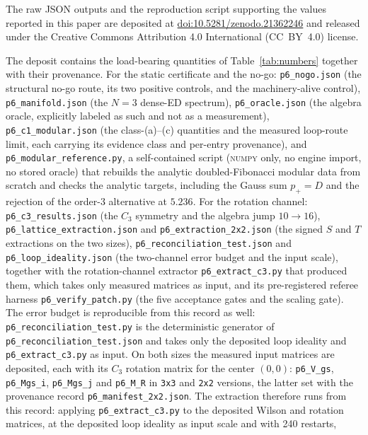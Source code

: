 \documentclass[aps,pra,twocolumn,superscriptaddress,longbibliography,floatfix,nofootinbib]{revtex4-2}
\begin{document}
The raw JSON outputs and the reproduction script supporting the values
reported in this paper are deposited at
\href{https://doi.org/10.5281/zenodo.21362246}{doi:10.5281/zenodo.21362246}
and released under the Creative Commons Attribution 4.0 International
(CC~BY~4.0) license.

The deposit contains the load-bearing quantities of Table~\ref{tab:numbers}
together with their provenance. For the static certificate and the no-go:
\texttt{p6\_nogo.json} (the structural no-go route, its two positive controls, and
the machinery-alive control), \texttt{p6\_manifold.json} (the $N=3$ dense-ED
spectrum), \texttt{p6\_oracle.json} (the algebra oracle, explicitly labeled as such
and not as a measurement), \texttt{p6\_c1\_modular.json} (the class-(a)--(c)
quantities and the measured loop-route limit, each carrying its evidence class
and per-entry provenance), and \texttt{p6\_modular\_reference.py}, a
self-contained script (\textsc{numpy} only, no engine import, no stored oracle)
that rebuilds the analytic doubled-Fibonacci modular data from scratch and
checks the analytic targets, including the Gauss sum $p_{+}=D$ and the rejection
of the order-3 alternative at $5.236$. For the rotation channel:
\texttt{p6\_c3\_results.json} (the $C_3$ symmetry and the algebra jump $10\to16$),
\texttt{p6\_lattice\_extraction.json} and \texttt{p6\_extraction\_2x2.json} (the signed
$S$ and $T$ extractions on the two sizes), \texttt{p6\_reconciliation\_test.json}
and \texttt{p6\_loop\_ideality.json} (the two-channel error budget and the input
scale), together with the rotation-channel extractor \texttt{p6\_extract\_c3.py}
that produced them, which takes only measured matrices as input, and its
pre-registered referee harness \texttt{p6\_verify\_patch.py} (the five acceptance
gates and the scaling gate). The error budget is reproducible from this record as
well: \texttt{p6\_reconciliation\_test.py} is the deterministic generator of
\texttt{p6\_reconciliation\_test.json} and takes only the deposited loop ideality
and \texttt{p6\_extract\_c3.py} as input. On both sizes the measured input matrices are
deposited, each with its $C_3$ rotation matrix for the center $(0,0)$:
\texttt{p6\_V\_gs}, \texttt{p6\_Mgs\_i}, \texttt{p6\_Mgs\_j} and \texttt{p6\_M\_R} in
\texttt{3x3} and \texttt{2x2} versions, the latter set with the provenance
record \texttt{p6\_manifest\_2x2.json}. The extraction therefore runs from this
record: applying \texttt{p6\_extract\_c3.py} to the deposited Wilson and rotation
matrices, at the deposited loop ideality as input scale and with 240 restarts,
\end{document}
